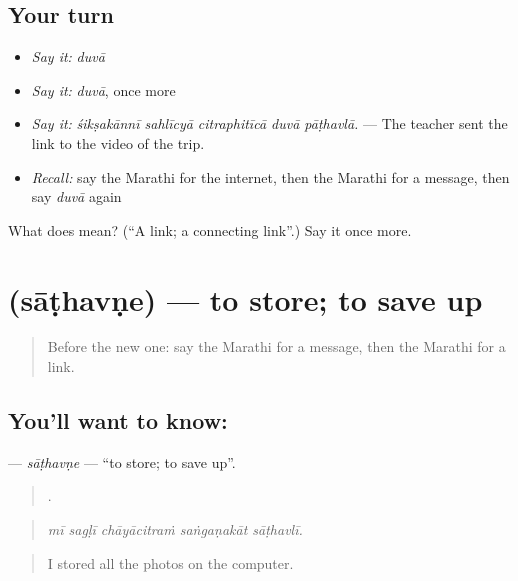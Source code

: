 \subsection*{Your turn}
\begin{itemize}
\raggedright
  \item \emph{Say it:} \emph{duvā}
  \item \emph{Say it:} \emph{duvā}, once more
  \item \emph{Say it:} \emph{śikṣakānnī sahlīcyā citraphitīcā duvā pāṭhavlā.} — The teacher sent the link to the video of the trip.
  \item \emph{Recall:} say the Marathi for the internet, then the Marathi for a message, then say \emph{duvā} again
\end{itemize}

\begin{tcolorbox}[breakable,colback=teal!4,colframe=teal!35!black,title={Before you move on}]
What does  mean? (\textquotedblleft{}A link; a connecting link\textquotedblright{}.) Say it once more.
\end{tcolorbox}
\section[\texorpdfstring{\mr{साठवणे} (sāṭhavṇe)}{साठवणे (sāṭhavṇe)}]{ (sāṭhavṇe) — to store; to save up}

\label{lesson:MR-C517-sathavne}



\begin{quote}
Before the new one: say the Marathi for a message, then the Marathi for a link.
\end{quote}

\subsection*{You'll want to know: }
\textbf{} — \emph{sāṭhavṇe} — \textquotedblleft{}to store; to save up\textquotedblright{}.

\begin{quote}
    .
\end{quote}

\begin{quote}
\emph{mī sagḷī chāyācitraṁ saṅgaṇakāt sāṭhavlī.}
\end{quote}

\begin{quote}
I stored all the photos on the computer.
\end{quote}

